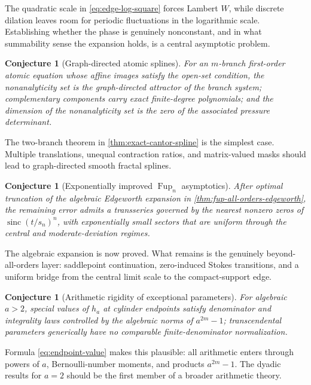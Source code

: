 \documentclass[11pt,oneside]{article}
\newtheorem{conjecture}[theorem]{Conjecture}
\theoremstyle{definition}
\theoremstyle{remark}
\newcommand{\Fup}{\operatorname{Fup}}
\newcommand{\sinc}{\operatorname{sinc}}
\begin{document}
The quadratic scale in \eqref{eq:edge-log-square} forces Lambert \(W\), while discrete dilation leaves room for periodic fluctuations in the logarithmic scale.  Establishing whether the phase is genuinely nonconstant, and in what summability sense the expansion holds, is a central asymptotic problem.

\begin{conjecture}[Graph-directed atomic splines]
\label{conj:graph-directed}
For an \(m\)-branch first-order atomic equation whose affine images satisfy the open-set condition, the nonanalyticity set is the graph-directed attractor of the branch system; complementary components carry exact finite-degree polynomials; and the dimension of the nonanalyticity set is the zero of the associated pressure determinant.
\end{conjecture}

The two-branch theorem in \cref{thm:exact-cantor-spline} is the simplest case.  Multiple translations, unequal contraction ratios, and matrix-valued masks should lead to graph-directed smooth fractal splines.

\begin{conjecture}[Exponentially improved \(\Fup_n\) asymptotics]
\label{conj:fup-exponential-improvement}
After optimal truncation of the algebraic Edgeworth expansion in
\cref{thm:fup-all-orders-edgeworth}, the remaining error admits a transseries governed by the
nearest nonzero zeros of \(\sinc(t/s_n)^n\), with exponentially small sectors that are uniform
through the central and moderate-deviation regimes.
\end{conjecture}

The algebraic expansion is now proved.  What remains is the genuinely beyond-all-orders layer:
saddlepoint continuation, zero-induced Stokes transitions, and a uniform bridge from the central
limit scale to the compact-support edge.

\begin{conjecture}[Arithmetic rigidity of exceptional parameters]
\label{conj:arithmetic-a}
For algebraic \(a>2\), special values of \(h_a\) at cylinder endpoints satisfy denominator and integrality laws controlled by the algebraic norms of \(a^{2m}-1\); transcendental parameters generically have no comparable finite-denominator normalization.
\end{conjecture}

Formula \eqref{eq:endpoint-value} makes this plausible: all arithmetic enters through powers of \(a\), Bernoulli-number moments, and products \(a^{2m}-1\).  The dyadic results for \(a=2\) should be the first member of a broader arithmetic theory.
\end{document}
